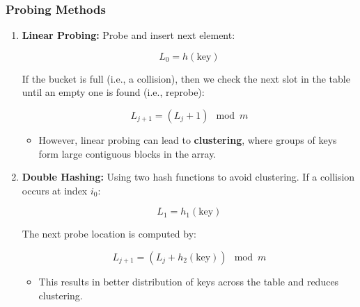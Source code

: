 \documentclass{article}
\begin{document}
    \subsubsection{Probing Methods}
    \begin{definition}
        \begin{enumerate}
            \item \textbf{Linear Probing:} Probe and insert next element:
            
            \[
            L_0 = h(\text{key})
            \]
            
            If the bucket is full (i.e., a collision), then we check the next slot in the table until an empty one is found (i.e., reprobe):
            
            \[
            L_{j+1} = (L_j + 1) \mod m
            \]
            
            \begin{itemize}
                \item However, linear probing can lead to \textbf{clustering}, where groups of keys form large contiguous blocks in the array.
            \end{itemize}
        
            \item \textbf{Double Hashing:} Using two hash functions to avoid clustering. If a collision occurs at index \(i_0\):
            
            \[
            L_1 = h_1(\text{key})
            \]
            
            The next probe location is computed by:
            
            \[
            L_{j+1} = (L_j + h_2(\text{key})) \mod m
            \]
            
            \begin{itemize}
                \item This results in better distribution of keys across the table and reduces clustering.
            \end{itemize}
        \end{enumerate}
    \end{definition}

\newpage
\end{document}
